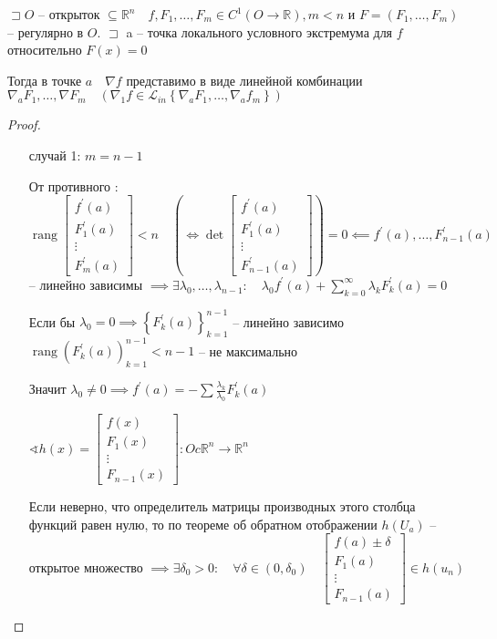 \documentclass{book}
\newcommand\R{\ensuremath{\mathbb{R}}}
\newcommand{\p}[1]{#1^{\prime}}
\theoremstyle{definition}
\DeclareMathOperator{\rang}{rang}
\begin{document}
\begin{theorem}

    $\sqsupset O$ -- открыток $\subseteq \R^n\quad f, F_1, \ldots, F_m\in C^1(O\to \R), m<n$ и $F = \left( F_1, \ldots, F_m \right) $ -- регулярно в $O$.  $\sqsupset $ a -- точка локального условного экстремума для $f$ относительно $F(x) = 0$ 

    Тогда в точке $a\quad \nabla f$ представимо в виде линейной комбинации $\nabla _aF_1, \ldots, \nabla F_m\quad \left( \nabla _1f\in \mathcal L_{in} \left\{ \nabla _aF_1, \ldots, \nabla _af_m \right\}  \right) $
\end{theorem}
\begin{proof}
    \begin{enumerate}
        \item [случай 1:] $m = n-1$

            От противного :  $\rang \begin{bmatrix} \p f(a)\\
                \p F_1(a)\\
                \vdots\\
                \p F_m(a)\end{bmatrix} <n\quad \left( \iff \det \begin{bmatrix} \p f(a)\\ \p F_1(a)\\ \vdots \\ \p F_{n-1}(a) \end{bmatrix}  \right)  = 0 \impliedby  \p f(a), \ldots, \p F_{n-1}(a)$ -- линейно зависимы $ \implies  \exists \lambda_0, \ldots, \lambda_{n-1}:\quad \lambda_0\p f(a) + \sum_{k=0}^{\infty} \lambda_k\p F_k(a) = 0$ 

                Если бы $\lambda_0 = 0 \implies \left\{ \p F_k(a) \right\} _{k=1}^{n-1}$ -- линейно зависимо $\rang\left( \p F_k(a) \right) _{k=1}^{n-1}<n-1$ -- не максимально

                Значит $\lambda_0\neq 0 \implies \p f(a) = -\sum \frac{\lambda_k}{\lambda_0}\p F_k(a)$
    
                $\sphericalangle h(x) = \begin{bmatrix} f(x)\\ F_1(x) \\ \vdots \\ F_{n-1}(x) \end{bmatrix} : Oc\R^n \to \R^n$

                Если неверно, что определитель матрицы производных  этого столбца функций равен нулю, то по теореме об обратном отображении $h(U_a)$ -- открытое множество  $\implies \exists \delta_0>0:\quad \forall \delta\in (0, \delta_0)\quad \begin{bmatrix} f(a)\pm \delta\\ F_1(a) \\ \vdots \\ F_{n-1}(a) \end{bmatrix} \in h(u_n)$


\end{enumerate}
\end{proof}
\end{document}
